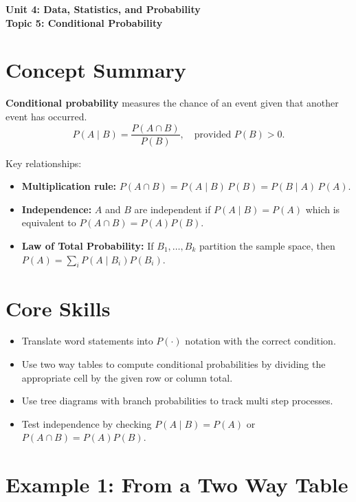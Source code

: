 \documentclass[12pt]{article}
\begin{document}
\begin{center}
    \LARGE \textbf{Unit 4: Data, Statistics, and Probability} \\[6pt]
    \Large \textbf{Topic 5: Conditional Probability}
\end{center}

\vspace{1em}

\section*{Concept Summary}

\textbf{Conditional probability} measures the chance of an event given that another event has occurred.  
\[
P(A\mid B)=\frac{P(A\cap B)}{P(B)},\quad \text{provided } P(B)>0.
\]

Key relationships:
\begin{itemize}
  \item \textbf{Multiplication rule:} \(P(A\cap B)=P(A\mid B)\,P(B)=P(B\mid A)\,P(A)\).
  \item \textbf{Independence:} \(A\) and \(B\) are independent if \(P(A\mid B)=P(A)\) which is equivalent to \(P(A\cap B)=P(A)P(B)\).
  \item \textbf{Law of Total Probability:} If \(B_1,\dots,B_k\) partition the sample space, then \(P(A)=\sum_i P(A\mid B_i)P(B_i)\).
\end{itemize}

\section*{Core Skills}
\begin{itemize}
  \item Translate word statements into \(P(\cdot)\) notation with the correct condition.
  \item Use two way tables to compute conditional probabilities by dividing the appropriate cell by the given row or column total.
  \item Use tree diagrams with branch probabilities to track multi step processes.
  \item Test independence by checking \(P(A\mid B)=P(A)\) or \(P(A\cap B)=P(A)P(B)\).
\end{itemize}

\section*{Example 1: From a Two Way Table}
\end{document}
